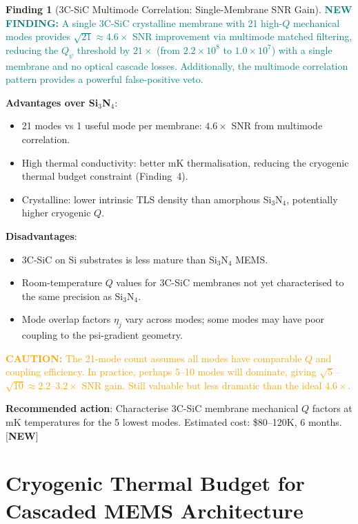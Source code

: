 \documentclass[11pt]{article}
\newcommand{\ee}[1]{\times 10^{#1}}
\newcommand{\Qpsi}{Q_\psi}
\newcommand{\caution}[1]{\textcolor{orange}{\textbf{CAUTION:} #1}}
\newcommand{\newfinding}[1]{\textcolor{teal}{\textbf{NEW FINDING:} #1}}
\theoremstyle{definition}
\newtheorem{finding}[theorem]{Finding}
\theoremstyle{remark}
\begin{document}
\begin{finding}[3C-SiC Multimode Correlation: Single-Membrane SNR Gain]
\label{find:SiC}
\newfinding{A single 3C-SiC crystalline membrane with 21 high-$Q$
mechanical modes provides $\sqrt{21} \approx 4.6\times$ SNR
improvement via multimode matched filtering, reducing the $\Qpsi$
threshold by $21\times$ (from $2.2\ee{8}$ to $1.0\ee{7}$) with
a single membrane and no optical cascade losses. Additionally,
the multimode correlation pattern provides a powerful false-positive
veto.}

\textbf{Advantages over Si$_3$N$_4$}:
\begin{itemize}[nosep]
\item 21 modes vs 1 useful mode per membrane: $4.6\times$ SNR
  from multimode correlation.
\item High thermal conductivity: better mK thermalisation,
  reducing the cryogenic thermal budget constraint (Finding~4).
\item Crystalline: lower intrinsic TLS density than amorphous
  Si$_3$N$_4$, potentially higher cryogenic $Q$.
\end{itemize}

\textbf{Disadvantages}:
\begin{itemize}[nosep]
\item 3C-SiC on Si substrates is less mature than Si$_3$N$_4$ MEMS.
\item Room-temperature $Q$ values for 3C-SiC membranes not yet
  characterised to the same precision as Si$_3$N$_4$.
\item Mode overlap factors $\eta_j$ vary across modes; some modes
  may have poor coupling to the psi-gradient geometry.
\end{itemize}

\caution{The 21-mode count assumes all modes have comparable $Q$
and coupling efficiency. In practice, perhaps 5--10 modes will
dominate, giving $\sqrt{5}$--$\sqrt{10} \approx 2.2$--$3.2\times$
SNR gain. Still valuable but less dramatic than the ideal $4.6\times$.}

\textbf{Recommended action}: Characterise 3C-SiC membrane mechanical
$Q$ factors at mK temperatures for the 5 lowest modes. Estimated
cost: \$80--120K, 6 months.
[\textbf{NEW}]
\end{finding}


\part{Cryogenic Thermal Budget for Cascaded MEMS Architecture}
\label{part:cryo}
\end{document}
